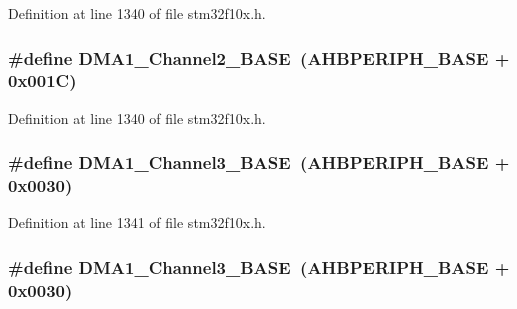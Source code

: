 Definition at line 1340 of file stm32f10x.\+h.

\subsubsection[{\texorpdfstring{D\+M\+A1\+\_\+\+Channel2\+\_\+\+B\+A\+SE}{DMA1_Channel2_BASE}}]{\setlength{\rightskip}{0pt plus 5cm}\#define D\+M\+A1\+\_\+\+Channel2\+\_\+\+B\+A\+SE~({\bf A\+H\+B\+P\+E\+R\+I\+P\+H\+\_\+\+B\+A\+SE} + 0x001\+C)}\hypertarget{group___peripheral__memory__map_ga38a70090eef3687e83fa6ac0c6d22267}{}\label{group___peripheral__memory__map_ga38a70090eef3687e83fa6ac0c6d22267}


Definition at line 1340 of file stm32f10x.\+h.

\subsubsection[{\texorpdfstring{D\+M\+A1\+\_\+\+Channel3\+\_\+\+B\+A\+SE}{DMA1_Channel3_BASE}}]{\setlength{\rightskip}{0pt plus 5cm}\#define D\+M\+A1\+\_\+\+Channel3\+\_\+\+B\+A\+SE~({\bf A\+H\+B\+P\+E\+R\+I\+P\+H\+\_\+\+B\+A\+SE} + 0x0030)}\hypertarget{group___peripheral__memory__map_ga70b3d9f36ca9ce95b4e421c11154fe5d}{}\label{group___peripheral__memory__map_ga70b3d9f36ca9ce95b4e421c11154fe5d}


Definition at line 1341 of file stm32f10x.\+h.

\subsubsection[{\texorpdfstring{D\+M\+A1\+\_\+\+Channel3\+\_\+\+B\+A\+SE}{DMA1_Channel3_BASE}}]{\setlength{\rightskip}{0pt plus 5cm}\#define D\+M\+A1\+\_\+\+Channel3\+\_\+\+B\+A\+SE~({\bf A\+H\+B\+P\+E\+R\+I\+P\+H\+\_\+\+B\+A\+SE} + 0x0030)}\hypertarget{group___peripheral__memory__map_ga70b3d9f36ca9ce95b4e421c11154fe5d}{}\label{group___peripheral__memory__map_ga70b3d9f36ca9ce95b4e421c11154fe5d}


